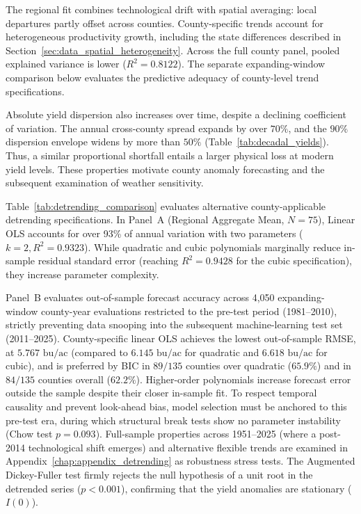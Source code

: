 The regional fit combines technological drift with spatial averaging: local departures partly offset across counties. County-specific trends account for heterogeneous productivity growth, including the state differences described in Section~\ref{sec:data_spatial_heterogeneity}. Across the full county panel, pooled explained variance is lower ($R^2=0.8122$). The separate expanding-window comparison below evaluates the predictive adequacy of county-level trend specifications.

Absolute yield dispersion also increases over time, despite a declining coefficient of variation. The annual cross-county spread expands by over $70\%$, and the $90\%$ dispersion envelope widens by more than $50\%$ (Table~\ref{tab:decadal_yields}). Thus, a similar proportional shortfall entails a larger physical loss at modern yield levels. These properties motivate county anomaly forecasting and the subsequent examination of weather sensitivity.





Table~\ref{tab:detrending_comparison} evaluates alternative county-applicable detrending specifications. In Panel~A (Regional Aggregate Mean, $N=75$), Linear OLS accounts for over 93\% of annual variation with two parameters ($k=2, R^2=0.9323$). While quadratic and cubic polynomials marginally reduce in-sample residual standard error (reaching $R^2=0.9428$ for the cubic specification), they increase parameter complexity. 

Panel~B evaluates out-of-sample forecast accuracy across 4,050 expanding-window county-year evaluations restricted to the pre-test period (1981--2010), strictly preventing data snooping into the subsequent machine-learning test set (2011--2025). County-specific linear OLS achieves the lowest out-of-sample RMSE, at $5.767\text{ bu/ac}$ (compared to $6.145\text{ bu/ac}$ for quadratic and $6.618\text{ bu/ac}$ for cubic), and is preferred by BIC in $89/135$ counties over quadratic ($65.9\%$) and in $84/135$ counties overall ($62.2\%$). Higher-order polynomials increase forecast error outside the sample despite their closer in-sample fit. To respect temporal causality and prevent look-ahead bias, model selection must be anchored to this pre-test era, during which structural break tests show no parameter instability (Chow test $p = 0.093$). Full-sample properties across 1951--2025 (where a post-2014 technological shift emerges) and alternative flexible trends are examined in Appendix~\ref{chap:appendix_detrending} as robustness stress tests. The Augmented Dickey-Fuller test firmly rejects the null hypothesis of a unit root in the detrended series ($p < 0.001$), confirming that the yield anomalies are stationary ($I(0)$).

